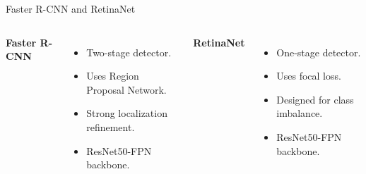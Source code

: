 \documentclass{beamer}
\begin{document}
	\begin{frame}{Faster R-CNN and RetinaNet}
		
		\begin{columns}
			
			
			\textbf{Faster R-CNN}
			
			\begin{itemize}
				\item Two-stage detector.
				\item Uses Region Proposal Network.
				\item Strong localization refinement.
				\item ResNet50-FPN backbone.
			\end{itemize}
			
			
			\textbf{RetinaNet}
			
			\begin{itemize}
				\item One-stage detector.
				\item Uses focal loss.
				\item Designed for class imbalance.
				\item ResNet50-FPN backbone.
			\end{itemize}
			
		\end{columns}
		
		\vspace{0.5cm}
		
		\begin{center}
		\end{center}
		
	\end{frame}
	
\end{document}
